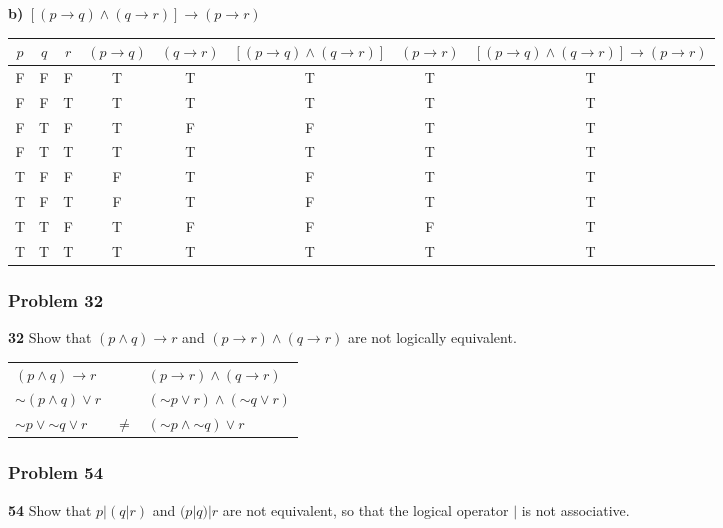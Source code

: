 \documentclass[paper=a4, fontsize=11pt]{scrartcl} %
\newcommand*{\oldneg}{\mathord{\sim}}
\begin{document}
\textbf{b)} $[(p \to q) \land (q \to r)] \to (p \to r)$\\

\begin{table}[H]
\centering
\begin{tabular}{ccc|cccc|c}
    $p$ & $q$ & $r$ & $(p \to q)$ & $(q \to r)$ & $[(p \to q) \land (q \to r)]$ & $(p \to r)$ & $[(p \to q) \land (q \to r)] \to (p \to r)$ \\ \hline
    F & F & F & T & T & T & T & T \\
    F & F & T & T & T & T & T & T \\
    F & T & F & T & F & F & T & T \\
    F & T & T & T & T & T & T & T \\
    T & F & F & F & T & F & T & T \\
    T & F & T & F & T & F & T & T \\
    T & T & F & T & F & F & F & T \\
    T & T & T & T & T & T & T & T
\end{tabular}
\end{table}


\subsubsection*{Problem 32}
\textbf{32} Show that $(p \land q) \to r$ and $(p \to r) \land (q \to r)$ are not
logically equivalent.\\


\begin{table}[H]
    \centering
    \begin{tabular}{lll}
        $(p \land q) \to r$ &  & $(p \to r) \land (q \to r)$ \\
        $\oldneg (p \land q) \lor r$ &  & $(\oldneg p \lor r) \land (\oldneg q \lor r)$ \\
        $\oldneg p \lor \oldneg q \lor r$ & $\ne$ & $(\oldneg p \land \oldneg q) \lor r$
    \end{tabular}
\end{table}

\subsubsection*{Problem 54}
\textbf{54} Show that $p  |  (q  |  r)$ and $(p  |  q)  |  r$ are not equivalent,
so that the logical operator $|$ is not associative.

\end{document}
